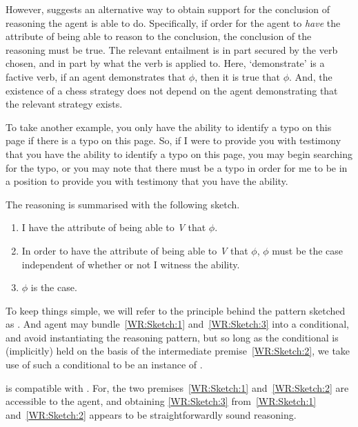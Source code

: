 \begin{note}[Compatibility]
  However, \AR{} suggests an alternative way to obtain support for the conclusion of reasoning the agent is able to do.
  Specifically, if order for the agent to \emph{have} the attribute of being able to reason to the conclusion, the conclusion of the reasoning must be true.
  The relevant entailment is in part secured by the verb chosen, and in part by what the verb is applied to.
  Here, `demonstrate' is a factive verb, if an agent demonstrates that \(\phi\), then it is true that \(\phi\).
  And, the existence of a chess strategy does not depend on the agent demonstrating that the relevant strategy exists.

  To take another example, you only have the ability to identify a typo on this page if there is a typo on this page.
  So, if I were to provide you with testimony that you have the ability to identify a typo on this page, you may begin searching for the typo, or you may note that there must be a typo in order for me to be in a position to provide you with testimony that you have the ability.

  The reasoning is summarised with the following sketch.

  \begin{enumerate}[label=(\textsf{A}\arabic*), ref=(\textsf{A}\arabic*)]
  \item\label{WR:Sketch:1} I have the attribute of being able to \emph{V} that \(\phi\).
  \item\label{WR:Sketch:2} In order to have the attribute of being able to \emph{V} that \(\phi\), \(\phi\) must be the case independent of whether or not I witness the ability.
  \item\label{WR:Sketch:3} \(\phi\) is the case.
  \end{enumerate}

  To keep things simple, we will refer to the principle behind the pattern sketched as \AR{}.
  And agent may bundle~\ref{WR:Sketch:1} and~\ref{WR:Sketch:3} into a conditional, and avoid instantiating the reasoning pattern, but so long as the conditional is (implicitly) held on the basis of the intermediate premise~\ref{WR:Sketch:2}, we take use of such a conditional to be an instance of \AR{}.

  \AR{} is compatible with \ESU{}.
  For, the two premises~\ref{WR:Sketch:1} and~\ref{WR:Sketch:2} are accessible to the agent, and obtaining \ref{WR:Sketch:3} from~\ref{WR:Sketch:1} and~\ref{WR:Sketch:2} appears to be straightforwardly sound reasoning.
\end{note}

